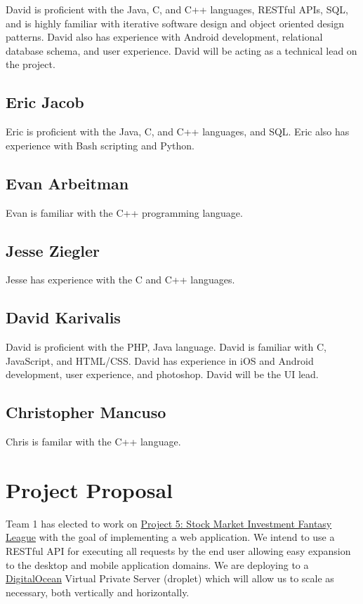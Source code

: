 \documentclass[11pt,letterpaper,oneside]{memoir}
\begin{document}
David is proficient with the Java, C, and C++ languages, RESTful APIs, SQL, and is
highly familiar with iterative software design and object oriented design patterns.
David also has experience with Android development, relational database schema, and
user experience.  David will be acting as a technical lead on the project.

\section{Eric Jacob}

Eric is proficient with the Java, C, and C++ languages, and SQL.  Eric also has
experience with Bash scripting and Python.

\section{Evan Arbeitman}

Evan is familiar with the C++ programming language.

\section{Jesse Ziegler}

Jesse has experience with the C and C++ languages.

\section{David Karivalis}

David is proficient with the PHP, Java language. David is familiar with C, JavaScript, and HTML/CSS.
David has experience in iOS and Android development, user experience, and photoshop.  David will be
the UI lead.

\section{Christopher Mancuso}

Chris is familar with the C++ language.

\chapter{Project Proposal}
\label{proposal}
Team 1 has elected to work on \href{http://ece.rutgers.edu/~marsic/books/SE/projects/}
{Project 5: Stock Market Investment Fantasy League} with the goal of implementing a
web application. We intend to use a RESTful API for executing all requests by the end user
allowing easy expansion to the desktop and mobile application domains. We are deploying to
a \href{http://www.digitialocean.com}{DigitalOcean} Virtual Private Server (droplet) which
will allow us to scale as necessary, both vertically and horizontally.\\
\end{document}
